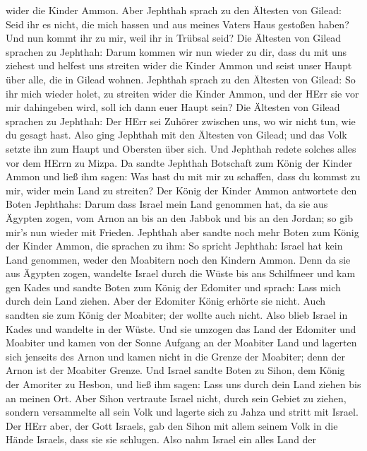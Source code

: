 wider die Kinder Ammon.  Aber Jephthah sprach zu den
Ältesten von Gilead: Seid ihr es nicht, die mich hassen und aus meines
Vaters Haus gestoßen haben? Und nun kommt ihr zu mir, weil ihr in
Trübsal seid?  Die Ältesten von Gilead sprachen zu Jephthah:
Darum kommen wir nun wieder zu dir, dass du mit uns ziehest und helfest
uns streiten wider die Kinder Ammon und seist unser Haupt über alle, die
in Gilead wohnen.  Jephthah sprach zu den Ältesten von
Gilead: So ihr mich wieder holet, zu streiten wider die Kinder Ammon,
und der HErr sie vor mir dahingeben wird, soll ich dann euer Haupt sein?
 Die Ältesten von Gilead sprachen zu Jephthah: Der HErr sei
Zuhörer zwischen uns, wo wir nicht tun, wie du gesagt hast.
 Also ging Jephthah mit den Ältesten von Gilead; und das
Volk setzte ihn zum Haupt und Obersten über sich. Und Jephthah redete
solches alles vor dem HErrn zu Mizpa.  Da sandte Jephthah
Botschaft zum König der Kinder Ammon und ließ ihm sagen: Was hast du mit
mir zu schaffen, dass du kommst zu mir, wider mein Land zu streiten?
 Der König der Kinder Ammon antwortete den Boten Jephthahs:
Darum dass Israel mein Land genommen hat, da sie aus Ägypten zogen, vom
Arnon an bis an den Jabbok und bis an den Jordan; so gib mir's nun
wieder mit Frieden.  Jephthah aber sandte noch mehr Boten
zum König der Kinder Ammon,  die sprachen zu ihm: So
spricht Jephthah: Israel hat kein Land genommen, weder den Moabitern
noch den Kindern Ammon.  Denn da sie aus Ägypten zogen,
wandelte Israel durch die Wüste bis ans Schilfmeer und kam gen Kades
 und sandte Boten zum König der Edomiter und sprach: Lass
mich durch dein Land ziehen. Aber der Edomiter König erhörte sie nicht.
Auch sandten sie zum König der Moabiter; der wollte auch nicht. Also
blieb Israel in Kades  und wandelte in der Wüste. Und sie
umzogen das Land der Edomiter und Moabiter und kamen von der Sonne
Aufgang an der Moabiter Land und lagerten sich jenseits des Arnon und
kamen nicht in die Grenze der Moabiter; denn der Arnon ist der Moabiter
Grenze.  Und Israel sandte Boten zu Sihon, dem König der
Amoriter zu Hesbon, und ließ ihm sagen: Lass uns durch dein Land ziehen
bis an meinen Ort.  Aber Sihon vertraute Israel nicht,
durch sein Gebiet zu ziehen, sondern versammelte all sein Volk und
lagerte sich zu Jahza und stritt mit Israel.  Der HErr
aber, der Gott Israels, gab den Sihon mit allem seinem Volk in die Hände
Israels, dass sie sie schlugen. Also nahm Israel ein alles Land der
